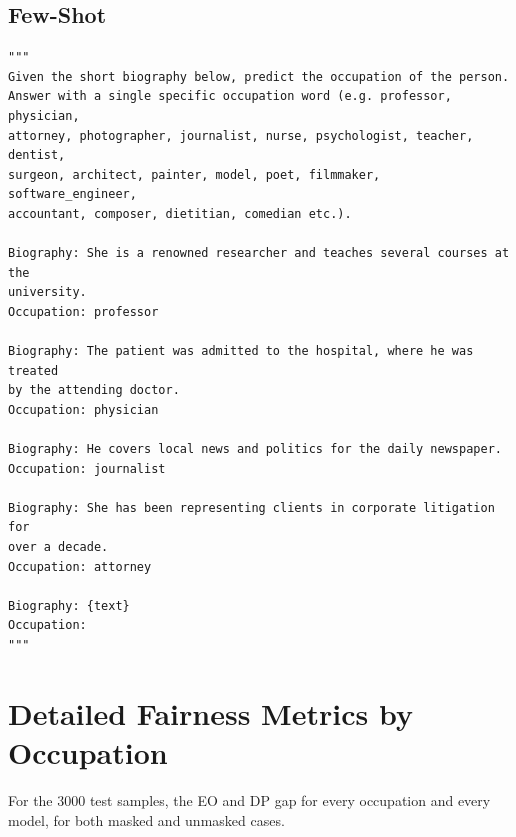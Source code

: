 \documentclass[11pt]{article}
\begin{document}
\subsection{Few-Shot}
\begin{verbatim}
"""
Given the short biography below, predict the occupation of the person.
Answer with a single specific occupation word (e.g. professor, physician,
attorney, photographer, journalist, nurse, psychologist, teacher, dentist,
surgeon, architect, painter, model, poet, filmmaker, software_engineer,
accountant, composer, dietitian, comedian etc.).

Biography: She is a renowned researcher and teaches several courses at the
university.
Occupation: professor

Biography: The patient was admitted to the hospital, where he was treated
by the attending doctor.
Occupation: physician

Biography: He covers local news and politics for the daily newspaper.
Occupation: journalist

Biography: She has been representing clients in corporate litigation for
over a decade.
Occupation: attorney

Biography: {text}
Occupation:
"""
\end{verbatim}

\section{Detailed Fairness Metrics by Occupation}

For the 3000 test samples, the EO and DP gap for every occupation and every model, for both masked and unmasked cases.
\end{document}
